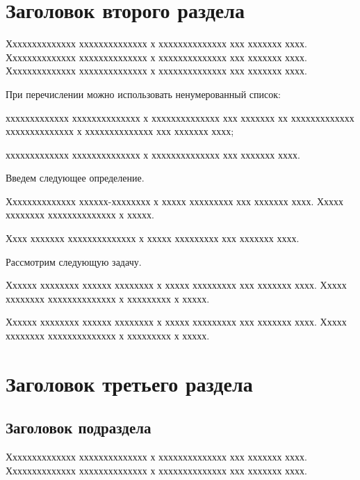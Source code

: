 \documentclass[12pt]{a&t}
\begin{document}
\section{Заголовок второго раздела}

Хххххххххххххх хххххххххххххх х хххххххххххххх ххх ххххххх хххх.
Хххххххххххххх хххххххххххххх х хххххххххххххх ххх ххххххх хххх.
Хххххххххххххх хххххххххххххх х хххххххххххххх ххх ххххххх хххх.

При перечислении можно использовать ненумерованный список:
\begin{itemlist}
\item
ххххххххххххх хххххххххххххх х хххххххххххххх ххх ххххххх хх
ххххххххххххх хххххххххххххх х хххххххххххххх ххх ххххххх хххх;

\item
ххххххххххххх хххххххххххххх х хххххххххххххх ххх ххххххх хххх.
\end{itemlist}

Введем следующее определение.

\begin{definition}
Хххххххххххххх хххххх-хххххххх х ххххх ххххххххх ххх ххххххх хххх.
Ххххх хххххххх хххххххххххххх х ххххх.
\end{definition}

Хххх ххххххх хххххххххххххх х ххххх ххххххххх ххх ххххххх хххх.

Рассмотрим следующую задачу.

\begin{problem} \label{prob:1}
Хххххх хххххххх хххххх хххххххх х ххххх ххххххххх ххх ххххххх хххх.
Ххххх хххххххх хххххххххххххх х ххххххххх х ххххх.
\end{problem}

Хххххх хххххххх хххххх хххххххх х ххххх ххххххххх ххх ххххххх хххх.
Ххххх хххххххх хххххххххххххх х ххххххххх х ххххх.


\section{Заголовок третьего раздела}

\subsection{Заголовок подраздела}

Хххххххххххххх хххххххххххххх х хххххххххххххх ххх ххххххх хххх.
Хххххххххххххх хххххххххххххх х хххххххххххххх ххх ххххххх хххх.
\end{document}
